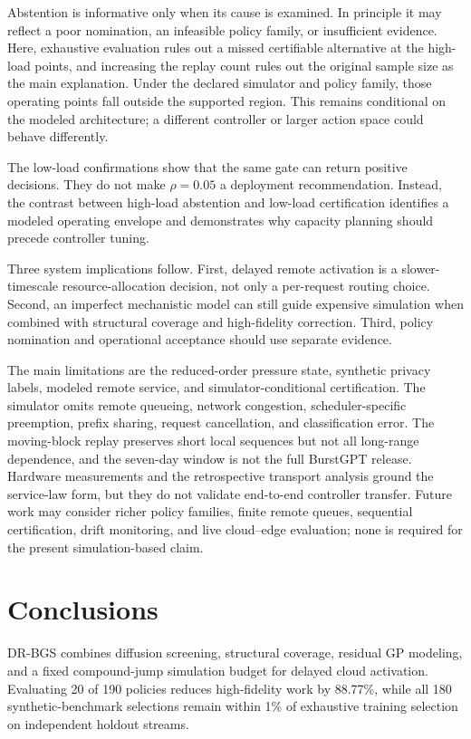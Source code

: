 \documentclass[futureinternet,article,submit,moreauthors]{Definitions/mdpi}
\begin{document}
Abstention is informative only when its cause is examined. In principle it may reflect a poor nomination, an infeasible policy family, or insufficient evidence. Here, exhaustive evaluation rules out a missed certifiable alternative at the high-load points, and increasing the replay count rules out the original sample size as the main explanation. Under the declared simulator and policy family, those operating points fall outside the supported region. This remains conditional on the modeled architecture; a different controller or larger action space could behave differently.

The low-load confirmations show that the same gate can return positive decisions. They do not make $\rho=0.05$ a deployment recommendation. Instead, the contrast between high-load abstention and low-load certification identifies a modeled operating envelope and demonstrates why capacity planning should precede controller tuning.

Three system implications follow. First, delayed remote activation is a slower-timescale resource-allocation decision, not only a per-request routing choice. Second, an imperfect mechanistic model can still guide expensive simulation when combined with structural coverage and high-fidelity correction. Third, policy nomination and operational acceptance should use separate evidence.

The main limitations are the reduced-order pressure state, synthetic privacy labels, modeled remote service, and simulator-conditional certification. The simulator omits remote queueing, network congestion, scheduler-specific preemption, prefix sharing, request cancellation, and classification error. The moving-block replay preserves short local sequences but not all long-range dependence, and the seven-day window is not the full BurstGPT release. Hardware measurements and the retrospective transport analysis ground the service-law form, but they do not validate end-to-end controller transfer. Future work may consider richer policy families, finite remote queues, sequential certification, drift monitoring, and live cloud--edge evaluation; none is required for the present simulation-based claim.

\section{Conclusions}
\label{sec:conclusion}

DR-BGS combines diffusion screening, structural coverage, residual GP modeling, and a fixed compound-jump simulation budget for delayed cloud activation. Evaluating 20 of 190 policies reduces high-fidelity work by 88.77\%, while all 180 synthetic-benchmark selections remain within 1\% of exhaustive training selection on independent holdout streams.
\end{document}
